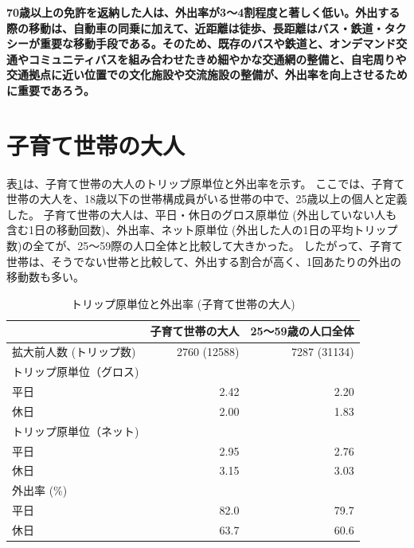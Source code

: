 \documentclass[a4paper,12pt, uplatex]{jsbook}
\begin{document}
\color{red}
\begin{framed}
\noindent
\textbf{\large 70歳以上の免許を返納した人は、外出率が3〜4割程度と著しく低い。外出する際の移動は、自動車の同乗に加えて、近距離は徒歩、長距離はバス・鉄道・タクシーが重要な移動手段である。そのため、既存のバスや鉄道と、オンデマンド交通やコミュニティバスを組み合わせたきめ細やかな交通網の整備と、自宅周りや交通拠点に近い位置での文化施設や交流施設の整備が、外出率を向上させるために重要であろう。}
\end{framed}
\color{black}



\clearpage
\section{子育て世帯の大人}

表\ref{tab:トリップ_外出率_子育て}は、子育て世帯の大人のトリップ原単位と外出率を示す。
ここでは、子育て世帯の大人を、18歳以下の世帯構成員がいる世帯の中で、25歳以上の個人と定義した。
子育て世帯の大人は、平日・休日のグロス原単位 (外出していない人も含む1日の移動回数)、外出率、ネット原単位 (外出した人の1日の平均トリップ数)の全てが、25〜59際の人口全体と比較して大きかった。
したがって、子育て世帯は、そうでない世帯と比較して、外出する割合が高く、1回あたりの外出の移動数も多い。
%
\begin{table}[htbp]
\centering
\caption{トリップ原単位と外出率 (子育て世帯の大人)}
\label{tab:トリップ_外出率_子育て}
\begin{tabular}{lrr}
\toprule
& 子育て世帯の大人 & 25〜59歳の人口全体 \\
\midrule
拡大前人数 (トリップ数) & 2760 (12588) & 7287 (31134)\\
トリップ原単位（グロス) & & \\
\hspace{2em} 平日 & 2.42 & 2.20 \\
\hspace{2em} 休日 & 2.00 & 1.83 \\
トリップ原単位（ネット) & & \\
\hspace{2em} 平日 & 2.95 & 2.76 \\
\hspace{2em} 休日 & 3.15 & 3.03\\
外出率 (\%) & & \\
\hspace{2em} 平日 & 82.0 & 79.7\\
\hspace{2em} 休日 & 63.7 & 60.6\\
\bottomrule
\end{tabular}
\end{table}
\end{document}
